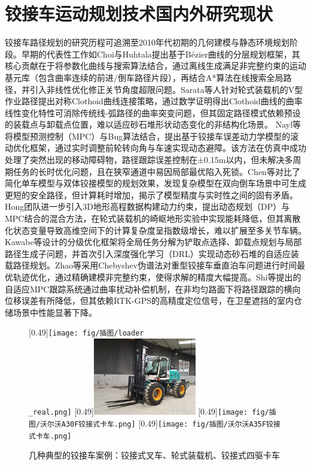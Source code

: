 \documentclass[master,academic]{ysuthesis} %
\begin{document}
	\section{铰接车运动规划技术国内外研究现状}
	铰接车路径规划的研究历程可追溯至2010年代初期的几何建模与静态环境规划阶段。早期的代表性工作如Choi与Huhtala提出基于Bézier曲线的分层规划框架\cite{choi2015constrained}，其核心贡献在于将参数化曲线与搜索算法结合，通过离线生成满足非完整约束的运动基元库（包含曲率连续的前进/倒车路径片段），再结合A*算法在线搜索全局路径，并引入非线性优化修正关节角度超限问题。Sarata等人\cite{yossawee2002path}针对轮式装载机的V型作业路径提出对称Clothoid曲线连接策略，通过数学证明得出Clothoid曲线的曲率线性变化特性可消除传统线-弧路径的曲率突变问题，但其固定路径模式依赖预设的装载点与卸载点位置，难以适应砂石堆形状动态变化的非结构化场景。 Nayl等\cite{nayl2013line}将模型预测控制（MPC）与Bug算法结合，提出基于铰接车误差动力学模型的滚动优化框架，通过实时调整前轮转向角与车速实现动态避障。该方法在仿真中成功处理了突然出现的移动障碍物，路径跟踪误差控制在±0.15m以内，但未解决多周期任务的长时优化问题，且在狭窄通道中易因局部最优陷入死锁。Chen等\cite{9216948}对比了简化单车模型与双体铰接模型的规划效果，发现复杂模型在双向倒车场景中可生成更短的安全路径，但计算耗时增加，揭示了模型精度与实时性之间的固有矛盾。Hong团队\cite{8500447}进一步引入3D地形高程数据构建动力约束，提出动态规划（DP）与MPC结合的混合方法，在轮式装载机的崎岖地形实验中实现能耗降低，但其离散化状态变量导致高维空间下的计算复杂度呈指数级增长，难以扩展至多关节车辆。Kawabe等\cite{Kawabe02122021}设计的分级优化框架将全局任务分解为铲取点选择、卸载点规划与局部路径生成子问题，并首次引入深度强化学习（DRL）实现动态砂石堆的自适应装载路径规划。Zhao等\cite{zhao2022time}采用Chebyshev伪谱法对重型铰接车垂直泊车问题进行时间最优轨迹优化，通过精确建模非完整约束，使得求解的精度大幅提高。Shi等\cite{shi2020planning}提出的自适应MPC跟踪系统通过曲率扰动补偿机制，在非均匀路面下将路径跟踪的横向位移误差有所降低，但其依赖RTK-GPS的高精度定位信号，在卫星遮挡的室内仓储场景中性能显著下降。
	\begin{figure}[!ht]
		\centering
		[0.49\textwidth]{\texttt{[image: fig/插图/loader\\\_real.png]}}
		[0.49\textwidth]{\includegraphics[width=0.4\textwidth]{fig/插图/四驱铰接式叉车.jpg}}
		[0.49\textwidth]{\texttt{[image: fig/插图/沃尔沃A30F铰接式卡车.png]}}
		[0.49\textwidth]{\texttt{[image: fig/插图/沃尔沃A35F铰接式卡车.png]}}
		\caption{几种典型的铰接车案例：铰接式叉车、轮式装载机、铰接式四驱卡车}
		\label{fig:几种典型的铰接车案例}
	\end{figure}
\end{document}
